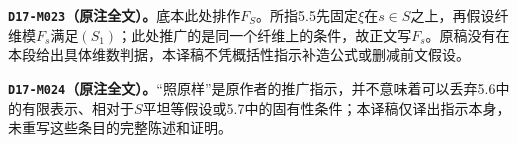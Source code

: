 \par\medskip\noindent\textbf{\texttt{D17-M023}（原注全文）。}底本此处排作$F_S$。所指5.5先固定$\xi$在$s\in S$之上，再假设纤维模$F_s$满足$(S_1)$；此处推广的是同一个纤维上的条件，故正文写$F_s$。原稿没有在本段给出具体维数判据，本译稿不凭概括性指示补造公式或删减前文假设。

\par\medskip\noindent\textbf{\texttt{D17-M024}（原注全文）。}“照原样”是原作者的推广指示，并不意味着可以丢弃5.6中的有限表示、相对于$S$平坦等假设或5.7中的固有性条件；本译稿仅译出指示本身，未重写这些条目的完整陈述和证明。
